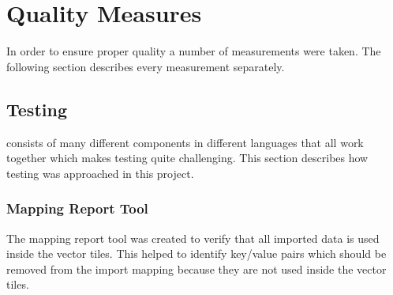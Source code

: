 \chapter{Quality Measures}\label{quality-measures}

In order to ensure proper quality a number of measurements were taken. The following section describes every measurement separately.

\section{Testing}\label{testing}

\osmvt{} consists of many different components in different languages that all work together which makes testing quite challenging. This section describes how testing was approached in this project.

\subsection{Mapping Report Tool}

The mapping report tool was created to verify that all imported \osm{} data is used inside the vector tiles. This helped to identify \osm{} key/value pairs which should be removed from the import mapping because they are not used inside the vector tiles.

